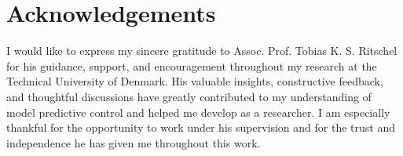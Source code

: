 \chapter{Acknowledgements}

I would like to express my sincere gratitude to Assoc. Prof. Tobias K. S. Ritschel for his guidance, support, and encouragement throughout my research at the Technical University of Denmark. His valuable insights, constructive feedback, and thoughtful discussions have greatly contributed to my understanding of model predictive control and helped me develop as a researcher. I am especially thankful for the opportunity to work under his supervision and for the trust and independence he has given me throughout this work.